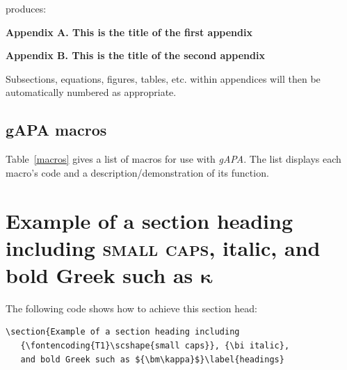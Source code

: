 \documentclass{gAPA2e}
\theoremstyle{plain}
\theoremstyle{remark}
\theoremstyle{definition}
\begin{document}
\noindent produces:\medskip

\noindent\textbf{Appendix A. This is the title of the first appendix}\medskip

\noindent\textbf{Appendix B. This is the title of the second appendix}\medskip

Subsections, equations, figures, tables, etc. within
appendices will then be automatically numbered as appropriate.


\subsection{{\bi gAPA} macros}

Table~\ref{macros} gives a list of macros for use with {\it gAPA}. The list displays each macro's code and a
description/demonstration of its function.

\begin{table} 
\label{macros}
\end{table}


\section{Example of a section heading including
   {\scshape{small caps}}, {\bi italic},
   and bold Greek such as ${\bm\kappa}$}\label{headings}

The following code shows how to achieve this section head:
%
\begin{verbatim}
\section{Example of a section heading including
   {\fontencoding{T1}\scshape{small caps}}, {\bi italic},
   and bold Greek such as ${\bm\kappa}$}\label{headings}
\end{verbatim}
\end{document}
